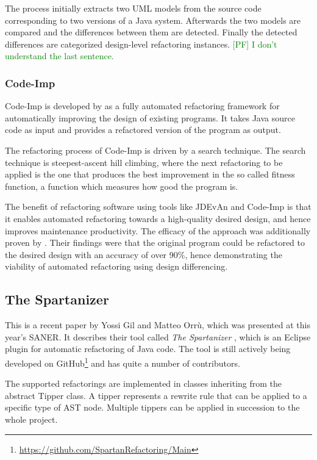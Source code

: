 \documentclass[conference,compsoc,a4paper]{IEEEtran}
\newcommand{\code}[1]{{\small\ttfamily #1}}
\newcommand{\pf}[1]{\textcolor{green}{[PF] #1}}
\begin{document}
The process initially extracts two UML models from the source code corresponding to two versions of a Java system. 
Afterwards the two models are compared and the differences between them are detected. Finally the detected differences 
are categorized	design-level refactoring instances. \pf{I don't understand the last sentence.}

\subsubsection{Code-Imp}

Code-Imp is developed by \cite{DBLP:journals/jss/OKeeffeC08, DBLP:conf/icse/MoghadamC11} as a fully automated 
refactoring framework for automatically improving the design of existing programs. It takes Java source code as input 
and provides a refactored version of the program as output.

The refactoring process of Code-Imp is driven by a search technique. The search technique is steepest-ascent 
hill climbing, where the next refactoring to be applied is the one that produces the best improvement in the so called 
fitness function, a function which measures how good the program is.

The benefit of refactoring software using tools like JDEvAn and Code-Imp is that it enables automated refactoring 
towards a high-quality desired design, and hence improves maintenance productivity. The efficacy of the approach was 
additionally proven by \cite{design-diff}. Their findings were that the original program could be refactored to the 
desired design with an accuracy of over 90\%, hence	demonstrating the viability of automated refactoring using design 
differencing.

\subsection{The Spartanizer}

This is a recent paper by Yossi Gil and Matteo Orrù, which was presented at this year's SANER. It describes their tool 
called \emph{The Spartanizer} \cite{sparta}, which is an Eclipse plugin for automatic refactoring of Java code. The 
tool is still actively being developed on GitHub\footnote{\url{https://github.com/SpartanRefactoring/Main}} and has 
quite a number of contributors.

The supported refactorings are implemented in classes inheriting from the abstract \code{Tipper} class. A tipper 
represents a rewrite rule that can be applied to a specific type of AST node. Multiple tippers can be applied in 
succession to the whole project.
\end{document}
